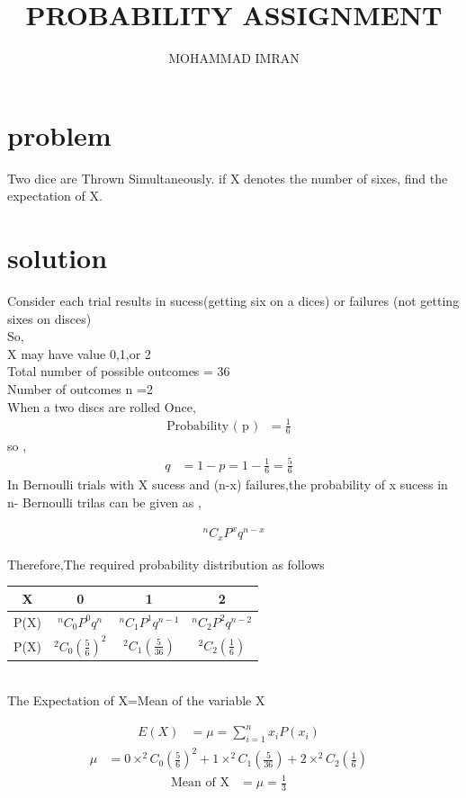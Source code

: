 \documentclass[journal,12pt,two column]{article}
\title{PROBABILITY ASSIGNMENT}
\author{MOHAMMAD IMRAN}
\begin{document}
\maketitle
\bigskip


 \section{problem }
  Two dice are Thrown Simultaneously. if X denotes the number of sixes, find the
expectation of X.

\section{solution }
Consider each trial results in sucess(getting six on a dices) or failures (not getting sixes on disces)\\
So,\\
X may have value 0,1,or 2\\
Total number of possible outcomes = 36\\
Number of outcomes n =2\\
When a  two discs are rolled Once,\\

\begin{align}
\text{Probability ( p )} &=
\frac{1}{6}&
 \end{align}
 so ,
 \begin{align}
  q &= 1-p = 1-\frac{1}{6} = \frac{5}{6}&
 \end{align}
 In Bernoulli trials with X sucess and (n-x) failures,the probability of x sucess in n- Bernoulli trilas can be given as ,
 
\begin{align}
 &^nC_xP^xq^{n-x}&
\end{align}

Therefore,The required probability distribution as follows\\

 \begin{tabular}{ |c |c |c |c |}
 \hline
 X  &  0  &  1  &  2\\
 \hline
 
 P(X)  &  $^nC_0P^0q^n$  &  $^nC_1P^1q^{n-1}$  &  $^nC_2P^2q^{n-2}$\\
 \hline
 
 P(X)  &   $^2C_0(\frac{5}{6})^2$ &  $^2C_1(\frac{5}{36})$ &   $^2C_2(\frac{1}{6})$ \\
 \hline
 
 \end{tabular}\\
 
 
 The Expectation of X=Mean of the variable X 
 
 \begin{align}
  E(X)&=\mu=\sum_{i=1}^{n} x_i P(x_i)&
\end{align}
\begin{align}
\mu&=0\times^2C_0(\frac{5}{6})^2+1\times^2C_1(\frac{5}{36})+2\times^2C_2(\frac{1}{6})&
\end{align}
\begin{align}
 \text{Mean of X}&=\mu=\frac{1}{3}&
 \end{align}
 
 
\end{document}
